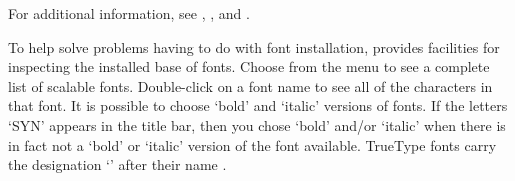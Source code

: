 


For additional information, see , ,
and .


To help solve problems having to do with font installation, 
{\DVIWindo} provides facilities for inspecting the installed base of fonts.
Choose  from the  %
menu to see a complete
list of scalable  fonts. %
Double-click on a font name to see all of the characters in that font.
It is possible to choose `bold' and `italic' versions of fonts.
If the letters `SYN' appears in the title bar, 
then you chose `bold' and/or `italic' when there is in fact not a
`bold' or `italic' version of the font available. %
%
True\-Type fonts carry the designation `' after their name%
.

